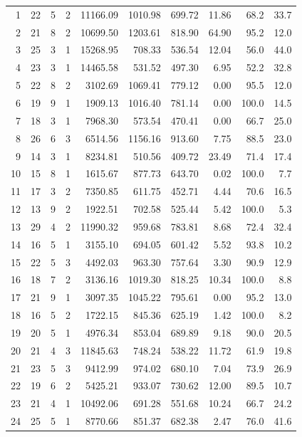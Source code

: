 \begin{longtable}{rrrrrrrrrr}
1 & 22 & 5 & 2 & 11166.09 & 1010.98 & 699.72 & 11.86 & 68.2 & 33.7 \\
2 & 21 & 8 & 2 & 10699.50 & 1203.61 & 818.90 & 64.90 & 95.2 & 12.0 \\
3 & 25 & 3 & 1 & 15268.95 & 708.33 & 536.54 & 12.04 & 56.0 & 44.0 \\
4 & 23 & 3 & 1 & 14465.58 & 531.52 & 497.30 & 6.95 & 52.2 & 32.8 \\
5 & 22 & 8 & 2 & 3102.69 & 1069.41 & 779.12 & 0.00 & 95.5 & 12.0 \\
6 & 19 & 9 & 1 & 1909.13 & 1016.40 & 781.14 & 0.00 & 100.0 & 14.5 \\
7 & 18 & 3 & 1 & 7968.30 & 573.54 & 470.41 & 0.00 & 66.7 & 25.0 \\
8 & 26 & 6 & 3 & 6514.56 & 1156.16 & 913.60 & 7.75 & 88.5 & 23.0 \\
9 & 14 & 3 & 1 & 8234.81 & 510.56 & 409.72 & 23.49 & 71.4 & 17.4 \\
10 & 15 & 8 & 1 & 1615.67 & 877.73 & 643.70 & 0.02 & 100.0 & 7.7 \\
11 & 17 & 3 & 2 & 7350.85 & 611.75 & 452.71 & 4.44 & 70.6 & 16.5 \\
12 & 13 & 9 & 2 & 1922.51 & 702.58 & 525.44 & 5.42 & 100.0 & 5.3 \\
13 & 29 & 4 & 2 & 11990.32 & 959.68 & 783.81 & 8.68 & 72.4 & 32.4 \\
14 & 16 & 5 & 1 & 3155.10 & 694.05 & 601.42 & 5.52 & 93.8 & 10.2 \\
15 & 22 & 5 & 3 & 4492.03 & 963.30 & 757.64 & 3.30 & 90.9 & 12.9 \\
16 & 18 & 7 & 2 & 3136.16 & 1019.30 & 818.25 & 10.34 & 100.0 & 8.8 \\
17 & 21 & 9 & 1 & 3097.35 & 1045.22 & 795.61 & 0.00 & 95.2 & 13.0 \\
18 & 16 & 5 & 2 & 1722.15 & 845.36 & 625.19 & 1.42 & 100.0 & 8.2 \\
19 & 20 & 5 & 1 & 4976.34 & 853.04 & 689.89 & 9.18 & 90.0 & 20.5 \\
20 & 21 & 4 & 3 & 11845.63 & 748.24 & 538.22 & 11.72 & 61.9 & 19.8 \\
21 & 23 & 5 & 3 & 9412.99 & 974.02 & 680.10 & 7.04 & 73.9 & 26.9 \\
22 & 19 & 6 & 2 & 5425.21 & 933.07 & 730.62 & 12.00 & 89.5 & 10.7 \\
23 & 21 & 4 & 1 & 10492.06 & 691.28 & 551.68 & 10.24 & 66.7 & 24.2 \\
24 & 25 & 5 & 1 & 8770.66 & 851.37 & 682.38 & 2.47 & 76.0 & 41.6 \\

\end{longtable}
